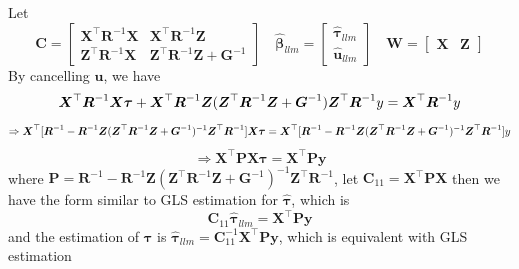 \documentclass[
  a4paper,
  oneside,
  openany,
  12pt,
  onecolumn]{book}
\theoremstyle{definition}
\theoremstyle{plain}
\theoremstyle{remark}
\begin{document}
Let \[
\boldsymbol{C}=
\begin{bmatrix}
\boldsymbol{X}^\top\boldsymbol{R}^{-1}\boldsymbol{X} & \boldsymbol{X}^\top\boldsymbol{R}^{-1}\boldsymbol{Z}\\
\boldsymbol{Z}^\top\boldsymbol{R}^{-1}\boldsymbol{X} & \boldsymbol{Z}^\top\boldsymbol{R}^{-1}\boldsymbol{Z}+ \boldsymbol{G}^{-1}
\end{bmatrix} 
\quad
\hat{\boldsymbol{\beta}}_{llm}=\begin{bmatrix}
\hat{\boldsymbol{\tau}}_{llm}\\
\hat{\boldsymbol{u}}_{llm}
\end{bmatrix}
\quad
\boldsymbol{W}=\begin{bmatrix}\boldsymbol{X} &\boldsymbol{Z}\end{bmatrix}
\] By cancelling \(\boldsymbol{u}\), we have \[
\boldsymbol{X}^\top\boldsymbol{R}^{-1}\boldsymbol{X}\boldsymbol{\tau}+\boldsymbol{X}^\top\boldsymbol{R}^{-1}\boldsymbol{Z}(\boldsymbol{Z}^\top\boldsymbol{R}^{-1}\boldsymbol{Z}+\boldsymbol{G}^{-1})\boldsymbol{Z}^\top\boldsymbol{R}^{-1}y=\boldsymbol{X}^\top\boldsymbol{R}^{-1}y\\
\] \[
\Rightarrow \boldsymbol{X}^\top[\boldsymbol{R}^{-1}-\boldsymbol{R}^{-1}\boldsymbol{Z}(\boldsymbol{Z}^\top\boldsymbol{R}^{-1}\boldsymbol{Z}+\boldsymbol{G}^{-1})^{-1}\boldsymbol{Z}^\top\boldsymbol{R}^{-1}]\boldsymbol{X}\boldsymbol{\tau}=\boldsymbol{X}^\top[\boldsymbol{R}^{-1}-\boldsymbol{R}^{-1}\boldsymbol{Z}(\boldsymbol{Z}^\top\boldsymbol{R}^{-1}\boldsymbol{Z}+\boldsymbol{G}^{-1})^{-1}\boldsymbol{Z}^\top\boldsymbol{R}^{-1}]y\\
\] \[
\Rightarrow \boldsymbol{X}^\top\boldsymbol{P}\boldsymbol{X}\boldsymbol{\tau}=\boldsymbol{X}^\top\boldsymbol{P}\boldsymbol{y}
\] where
\(\boldsymbol{P}=\boldsymbol{R}^{-1}-\boldsymbol{R}^{-1}\boldsymbol{Z}(\boldsymbol{Z}^\top\boldsymbol{R}^{-1}\boldsymbol{Z}+\boldsymbol{G}^{-1})^{-1}\boldsymbol{Z}^\top\boldsymbol{R}^{-1}\),
let
\(\boldsymbol{C}_{11}=\boldsymbol{X}^\top\boldsymbol{P}\boldsymbol{X}\)
then we have the form similar to GLS estimation for
\(\hat{\boldsymbol{\tau}}\), which is \[
\boldsymbol{C}_{11}\hat{\boldsymbol{\tau}}_{llm}=\boldsymbol{X}^\top\boldsymbol{P}\boldsymbol{y}
\] and the estimation of \(\boldsymbol{\tau}\) is
\(\hat{\boldsymbol{\tau}}_{llm}=\boldsymbol{C}_{11}^{-1}\boldsymbol{X}^\top\boldsymbol{P}\boldsymbol{y}\),
which is equivalent with GLS estimation
\end{document}
